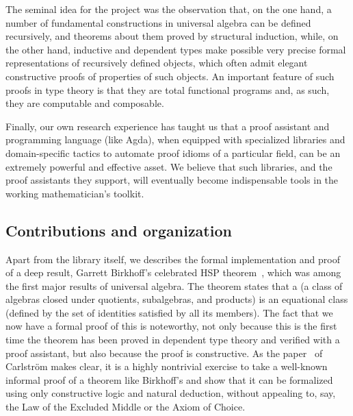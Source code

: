 The seminal idea for the \agdaualib project was the observation that, on the one hand, a number of fundamental constructions in universal algebra can be defined recursively, and theorems about them proved by structural induction, while, on the other hand, inductive and dependent types make possible very precise formal representations of recursively defined objects, which often admit elegant constructive proofs of properties of such objects.  An important feature of such proofs in type theory is that they are total functional programs and, as such, they are computable and composable.

Finally, our own research experience has taught us that a proof assistant and programming language (like Agda), when equipped with specialized libraries and domain-specific tactics to automate proof idioms of a particular field, can be an extremely powerful and effective asset. We believe that such libraries, and the proof assistants they support, will eventually become indispensable tools in the working mathematician's toolkit.



\subsection{Contributions and organization}
\label{sec:contributions}
Apart from the library itself, we describes the formal implementation and proof of a deep result, Garrett Birkhoff's celebrated HSP theorem~\cite{Birkhoff:1935}, which was among the first major results of universal algebra.  The theorem states that a  (a class of algebras closed under quotients, subalgebras, and products) is an equational class (defined by the set of identities satisfied by all its members).  %
The fact that we now have a formal proof of this is noteworthy, not only because this is the first time the theorem has been proved in dependent type theory and verified with a proof assistant, but also because the proof is constructive. As the paper~\cite{Carlstrom:2008} of Carlstr\"om makes clear, it is a highly nontrivial exercise to take a well-known informal proof of a theorem like Birkhoff's and show that it can be formalized using only constructive logic and natural deduction, without appealing to, say, the Law of the Excluded Middle or the Axiom of Choice.

